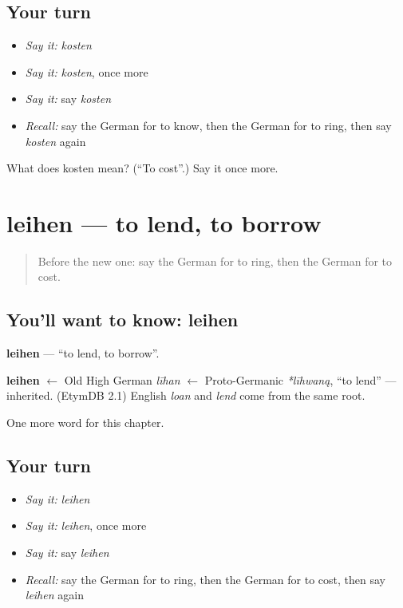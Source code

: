 \subsection*{Your turn}
\begin{itemize}
\raggedright
  \item \emph{Say it:} \emph{kosten}
  \item \emph{Say it:} \emph{kosten}, once more
  \item \emph{Say it:} say \emph{kosten}
  \item \emph{Recall:} say the German for to know, then the German for to ring, then say \emph{kosten} again
\end{itemize}

\begin{tcolorbox}[breakable,colback=teal!4,colframe=teal!35!black,title={Before you move on}]
What does kosten mean? (\textquotedblleft{}To cost\textquotedblright{}.) Say it once more.
\end{tcolorbox}
\section[leihen]{leihen — to lend, to borrow}

\label{lesson:GE-C148-leihen}



\begin{quote}
Before the new one: say the German for to ring, then the German for to cost.
\end{quote}

\subsection*{You'll want to know: leihen}
\textbf{leihen} — \textquotedblleft{}to lend, to borrow\textquotedblright{}.

\begin{cousinweb}
\textbf{leihen} $\leftarrow$ Old High German \emph{līhan} $\leftarrow$ Proto-Germanic \emph{*līhwaną}, \textquotedblleft{}to lend\textquotedblright{} — inherited. (EtymDB 2.1) English \emph{loan} and \emph{lend} come from the same root.
\end{cousinweb}

\begin{grammarlens}[title={What you've built}]
One more word for this chapter.
\end{grammarlens}

\subsection*{Your turn}
\begin{itemize}
\raggedright
  \item \emph{Say it:} \emph{leihen}
  \item \emph{Say it:} \emph{leihen}, once more
  \item \emph{Say it:} say \emph{leihen}
  \item \emph{Recall:} say the German for to ring, then the German for to cost, then say \emph{leihen} again
\end{itemize}

